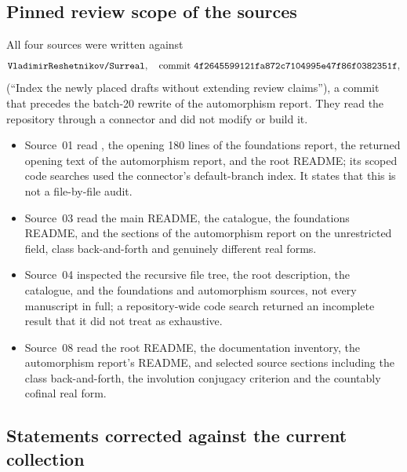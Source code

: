 \documentclass[11pt,letterpaper]{article}
\numberwithin{equation}{section}
\theoremstyle{definition}
\theoremstyle{remark}
\newcommand{\fullhash}{\texttt{4f264559\allowbreak 9121fa87\allowbreak 2c710499\allowbreak 5e47f86f\allowbreak 0382351f}}
\newcommand{\repo}{\texttt{VladimirReshetnikov/Surreal}}
\begin{document}
\subsection{Pinned review scope of the sources}

All four sources were written against
\[
 \repo,\quad\text{commit }\fullhash,
\]
(``Index the newly placed drafts without extending review claims''), a commit
that precedes the batch-20 rewrite of the automorphism report. They read the repository
through a connector and did not modify or build it.
\begin{itemize}
\item Source~01 read , the opening 180 lines of the
foundations report, the returned opening text of the automorphism report, and
the root README; its scoped code searches used the connector's default-branch
index. It states that this is not a file-by-file audit.
\item Source~03 read the main README, the catalogue, the foundations README, and
the sections of the automorphism report on the unrestricted field, class
back-and-forth and genuinely different real forms.
\item Source~04 inspected the recursive file tree, the root description, the
catalogue, and the foundations and automorphism sources, not every manuscript
in full; a repository-wide code search returned an incomplete result that it did
not treat as exhaustive.
\item Source~08 read the root README, the documentation inventory, the
automorphism report's README, and selected source sections including the class
back-and-forth, the involution conjugacy criterion and the countably cofinal
real form.
\end{itemize}

\subsection{Statements corrected against the current collection}
\end{document}
